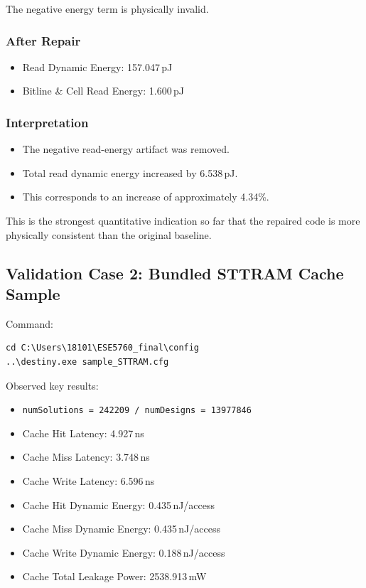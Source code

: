 \documentclass[11pt]{article}
\begin{document}
The negative energy term is physically invalid.

\subsubsection*{After Repair}

\begin{itemize}[leftmargin=1.5em]
    \item Read Dynamic Energy: 157.047\,pJ
    \item Bitline \& Cell Read Energy: 1.600\,pJ
\end{itemize}

\subsubsection*{Interpretation}

\begin{itemize}[leftmargin=1.5em]
    \item The negative read-energy artifact was removed.
    \item Total read dynamic energy increased by 6.538\,pJ.
    \item This corresponds to an increase of approximately 4.34\%.
\end{itemize}

This is the strongest quantitative indication so far that the repaired code is more physically consistent than the original baseline.

\subsection{Validation Case 2: Bundled STTRAM Cache Sample}

Command:

\begin{verbatim}
cd C:\Users\18101\ESE5760_final\config
..\destiny.exe sample_STTRAM.cfg
\end{verbatim}

Observed key results:

\begin{itemize}[leftmargin=1.5em]
    \item \texttt{numSolutions = 242209 / numDesigns = 13977846}
    \item Cache Hit Latency: 4.927\,ns
    \item Cache Miss Latency: 3.748\,ns
    \item Cache Write Latency: 6.596\,ns
    \item Cache Hit Dynamic Energy: 0.435\,nJ/access
    \item Cache Miss Dynamic Energy: 0.435\,nJ/access
    \item Cache Write Dynamic Energy: 0.188\,nJ/access
    \item Cache Total Leakage Power: 2538.913\,mW
\end{itemize}
\end{document}
